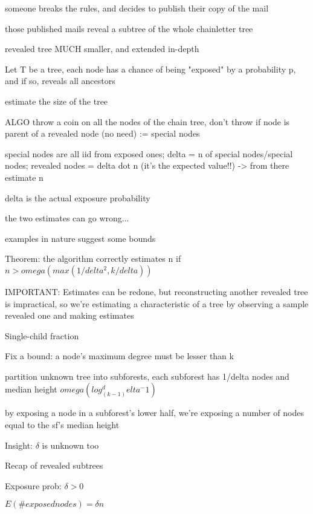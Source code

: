 \documentclass{report}
\begin{document}
	
	someone breaks the rules, and decides to publish their copy of the mail
	
	those published mails reveal a subtree of the whole chainletter tree
	
	revealed tree MUCH smaller, and extended in-depth
	
	
	Let T be a tree, each node has a chance of being "exposed" by a probability p, and if so, reveals all ancestors
	
	estimate the size of the tree
	
	ALGO
	throw a coin on all the nodes of the chain tree, don't throw if node is parent of a revealed node (no need) := special nodes
	
	special nodes are all iid from exposed ones; delta = n of special nodes/special nodes; revealed nodes = delta dot n (it's the expected value!!) -> from there estimate n
	
	delta is the actual exposure probability
	
	the two estimates can go wrong...
	
	examples in nature suggest some bounds
	
	
	Theorem: the algorithm correctly estimates n if $n > omega(max(1/delta^2, k/delta))$
	
		
		IMPORTANT: Estimates can be redone, but reconstructing another revealed tree is impractical, so we're estimating a characteristic of  a tree by observing a sample revealed one and making estimates
	
	Single-child fraction
	
	Fix a bound: a node's maximum degree must be lesser than k
	
	partition unknown tree into subforests, each subforest has 1/delta nodes and median height $omega(log_(k-1)^delta^-1)$
	
	by exposing a node in a subforest's lower half, we're exposing a number of nodes equal to the sf's median height
	
	
	
	
	Insight: $\delta$ is unknown too
	
	Recap of revealed subtrees
	
	Exposure prob: $\delta > 0$
	
	$E(\# exposed nodes) = \delta n$
	
\end{document}
